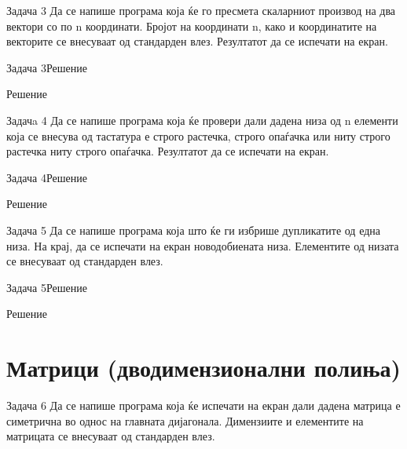 \begin{frame}{Задача 3}
Да се напише програма која ќе го пресмета скаларниот производ на два вектори со по n координати. 
Бројот на координати n, како и координатите на векторите се внесуваат од
стандарден влез. Резултатот да се испечати на екран.
\end{frame}

\begin{frame}[fragile]{Задача 3}{Решение} 
\begin{exampleblock}{Решение}

\end{exampleblock}
\end{frame}

\begin{frame}{Задачa 4}
Да се напише програма која ќе провери дали дадена низа од n елементи која се
внесува од тастатура е строго растечка, строго опаѓачка или ниту строго растечка
ниту строго опаѓачка. Резултатот да се испечати на екран.
\end{frame}

\begin{frame}[fragile,shrink=10]{Задача 4}{Решение} 
\begin{exampleblock}{Решение}

\end{exampleblock}
\end{frame}

\begin{frame}{Задача 5}
Да се напише програма која што ќе ги избрише дупликатите од една низа. На крај,
да се испечати на екран новодобиената низа. Елементите од низата се внесуваат од стандарден влез.
\end{frame}

\begin{frame}[fragile]{Задача 5}{Решение} 
\begin{exampleblock}{Решение}

\end{exampleblock}
\end{frame}

\section{Матрици (дводимензионални полиња)}

\begin{frame}{Задача 6}
Да се напише програма која ќе испечати на екран дали дадена матрица е симетрична во однос на главната дијагонала. 
Димензиите и елементите на матрицата се внесуваат од стандарден влез.
\end{frame}

